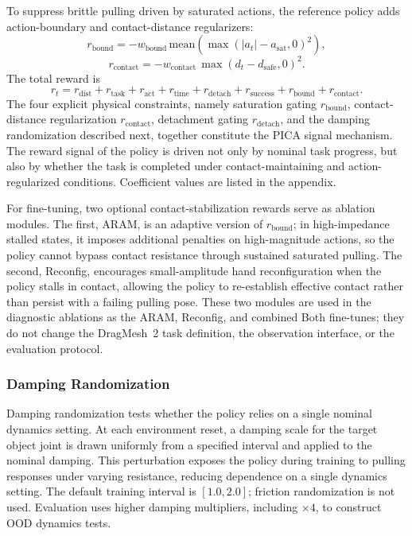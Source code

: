 \documentclass{llmxive}
\begin{document}
To suppress brittle pulling driven by saturated actions, the
reference policy adds action-boundary and contact-distance
regularizers:
\begin{equation}
r_{\mathrm{bound}} = -w_{\mathrm{bound}}\,
\mathrm{mean}\!\left(
\max(|a_t|-a_{\mathrm{sat}},0)^2\right),
\end{equation}
\begin{equation}
r_{\mathrm{contact}} = -w_{\mathrm{contact}}\,
\max(d_t-d_{\mathrm{safe}},0)^2.
\end{equation}
The total reward is
\begin{equation}
r_t = r_{\mathrm{dist}} + r_{\mathrm{task}} + r_{\mathrm{act}}
+ r_{\mathrm{time}} + r_{\mathrm{detach}}
+ r_{\mathrm{success}}
+ r_{\mathrm{bound}} + r_{\mathrm{contact}}.
\label{eq:totalreward}
\end{equation}
The four explicit physical constraints, namely saturation gating
$r_{\mathrm{bound}}$, contact-distance regularization
$r_{\mathrm{contact}}$, detachment gating $r_{\mathrm{detach}}$, and
the damping randomization described next, together constitute the
PICA signal mechanism. The reward signal of the policy is driven not
only by nominal task progress, but also by whether the task is
completed under contact-maintaining and action-regularized
conditions. Coefficient values are listed in the appendix.

For fine-tuning, two optional contact-stabilization rewards serve as
ablation modules. The first, ARAM, is an adaptive version of
$r_{\mathrm{bound}}$; in high-impedance stalled states, it imposes
additional penalties on high-magnitude actions, so the policy cannot
bypass contact resistance through sustained saturated pulling. The
second, Reconfig, encourages small-amplitude hand reconfiguration
when the policy stalls in contact, allowing the policy to
re-establish effective contact rather than persist with a failing
pulling pose. These two modules are used in the diagnostic ablations
as the ARAM, Reconfig, and combined Both fine-tunes; they do not
change the DragMesh~2 task definition, the observation interface, or
the evaluation protocol.


\subsubsection{Damping Randomization}
\label{sec:damprand}

Damping randomization tests whether the policy relies on a single
nominal dynamics setting. At each environment reset, a damping scale
for the target object joint is drawn uniformly from a specified
interval and applied to the nominal damping. This perturbation
exposes the policy during training to pulling responses under
varying resistance, reducing dependence on a single dynamics
setting. The default training interval is $[1.0, 2.0]$; friction
randomization is not used. Evaluation uses higher damping
multipliers, including $\times 4$, to construct OOD dynamics tests.
\end{document}
